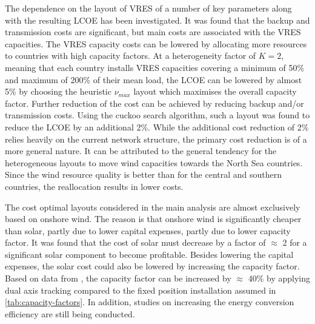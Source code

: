 \documentclass[a4paper, 5p, sort&compress]{elsarticle}%
\begin{document}
The dependence on the layout of VRES of a number of key parameters
along with the resulting LCOE has been investigated. It was found that
the backup and transmission costs are significant, but main costs are
associated with the VRES capacities. The VRES capacity costs can be
lowered by allocating more resources to countries with high capacity
factors. At a heterogeneity factor of $K = 2$, meaning that each
country installs VRES capacities covering a minimum of 50\% and
maximum of 200\% of their mean load, the LCOE can be lowered by almost
5\% by choosing the heuristic $\nu_{max}$ layout which maximises the
overall capacity factor. Further reduction of the cost can be achieved
by reducing backup and/or transmission costs. Using the cuckoo search
algorithm, such a layout was found to reduce the LCOE by an additional
2\%. While the additional cost reduction of 2\% relies heavily on the
current network structure, the primary cost reduction is of a more
general nature. It can be attributed to the general tendency for the
heterogeneous layouts to move wind capacities towards the North Sea
countries. Since the wind resource quality is better than for the
central and southern countries, the reallocation results in lower
costs.



The cost optimal layouts considered in the main analysis are almost
exclusively based on onshore wind. The reason is that onshore wind is
significantly cheaper than solar, partly due to lower capital
expenses, partly due to lower capacity factor. It was found that the
cost of solar must decrease by a factor of $\approx$ 2 for a
significant solar component to become profitable. Besides lowering the
capital expenses, the solar cost could also be lowered by increasing
the capacity factor. Based on data from \cite{REA}, the capacity factor can
be increased by $\approx$ 40\% by applying dual axis tracking compared
to the fixed position installation assumed in
\cref{tab:capacity-factors}. In addition, studies on increasing the
energy conversion efficiency are still being conducted.
\end{document}
